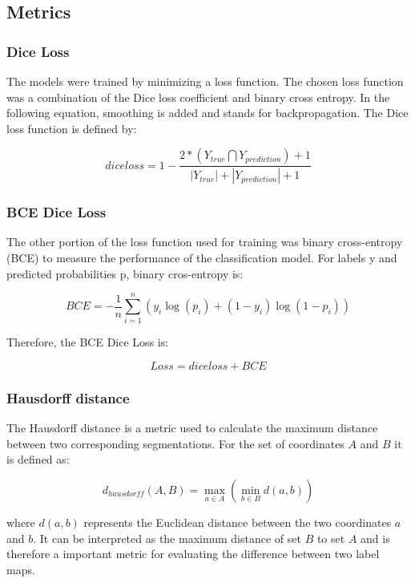 \subsection{Metrics}\label{metrics_chapter}

\subsubsection{Dice Loss}
The models were trained by minimizing a loss function. The chosen loss function was a combination of the Dice loss coefficient and binary cross entropy. In the following equation, smoothing is added and stands for backpropagation. The Dice loss function is defined by:

\begin{equation}
dice loss = 1 - \frac{2*(Y_{true} \bigcap Y_{prediction}) + 1}{|Y_{true}| + |Y_{prediction}| + 1}
\end{equation} 

\subsubsection{BCE Dice Loss}
The other portion of the loss function used for training was binary cross-entropy (BCE) to measure the performance of the classification model. For labels y and predicted probabilities p, binary cros-entropy is:

\begin{equation}
BCE = - \frac{1}{n} \sum_{i=1}^{n}(y_i \log{(p_i)} + (1-y_i)\log{(1-p_i)})
\end{equation} 

Therefore, the BCE Dice Loss is:

\begin{equation}
Loss =  dice loss + BCE
\end{equation}

\subsubsection{Hausdorff distance}
The Hausdorff distance is a metric used to calculate the maximum distance between two corresponding segmentations.\newline
For the set of coordinates $A$ and $B$ it is defined as:

\begin{equation}
	d_{hausdorff} (A,B) = \max_{a \in A} (\min_{b \in B} d(a,b))
\end{equation} 

where $d(a,b)$ represents the Euclidean distance between the two coordinates $a$ and $b$. It can be interpreted as the maximum distance of set $B$ to set $A$ and is therefore a important metric for evaluating the difference between two label maps.

